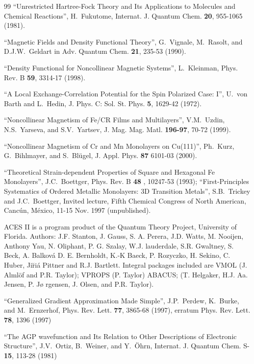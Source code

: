 \documentclass[nofootinbib,floatfix,aps,pra,preprint]{revtex4}
\begin{document}
\begin{thebibliography}{99}
 \textrm{{\small ``Unrestricted Hartree-Fock Theory and
Its Applications to Molecules and Chemical Reactions'', H.~Fukutome,
Internat. J. Quantum Chem. \textbf{20}, 955-1065 (1981). }}

 \textrm{{\small ``Magnetic Fields and Density
Functional Theory'', G.~Vignale, M.~Rasolt, and D.J.W.~Geldart in Adv.
Quantum Chem. \textbf{21}, 235-53 (1990). }}

 \textrm{{\small ``Density Functional for Noncollinear
Magnetic Systems'', L.~Kleinman, Phys. Rev. B \textbf{59}, 3314-17 (1998). }}

 \textrm{{\small ``A Local Exchange-Correlation Potential for
the Spin Polarized Case: I'', U.~von Barth and L.~Hedin, J. Phys. C: Sol.
St. Phys. \textbf{5}, 1629-42 (1972). }}

 \textrm{{\small ``Noncollinear Magnetism of Fe/CR Films
and Multilayers'', V.M.~Uzdin, N.S.~Yarseva, and S.V.~Yartsev, J. Mag. Mag.
Matl. \textbf{196-97}, 70-72 (1999). }}

 \textrm{{\small ``Noncollinear Magnetism of Cr and Mn
Monolayers on Cu(111)'', Ph.~Kurz, G.~Bihlmayer, and S.~Bl\"ugel, J. Appl.
Phys. \textbf{87} 6101-03 (2000). }}

 \textrm{{\small ``Theoretical Strain-dependent Properties of
Square and Hexagonal Fe Monolayers'', J.C.~Boettger, Phys. Rev. B \textbf{48}%
, 10247-53 (1993); ``First-Principles Systematics of Ordered Metallic
Monolayers: 3D Transition Metals'', S.B.~Trickey and J.C.~Boettger, Invited
lecture, Fifth Chemical Congress of North American, Canc\'un, M\'exico,
11-15 Nov. 1997 (unpublished). }}

 \textrm{{\small ACES II is a program product of the Quantum
Theory Project, University of Florida. Authors: J.F. Stanton, J. Gauss, S.
A. Perera, J.D. Watts, M. Nooijen, Anthony Yau, N. Oliphant, P. G. Szalay,
W.J. lauderdale, S.R. Gwaltney, S. Beck, A. Balkov{\'a} D. E. Bernholdt,
K.-K Baeck, P. Rozyczko, H. Sekino, C. Huber, Ji\u{r}i{\'a} Pittner and R.J.
Bartlett. Integral packages included are VMOL (J. Alml{\"o}f and P.R.
Taylor); VPROPS (P. Taylor) ABACUS; (T. Helgaker, H.J. Aa. Jensen, P. J{\o }%
rgensen, J. Olsen, and P.R. Taylor). }}

 \textrm{{\small ``Generalized Gradient Approximation Made
Simple'', J.P.~Perdew, K.~Burke, and M.~Ernzerhof, Phys. Rev. Lett. \textbf{%
77}, 3865-68 (1997), erratum Phys. Rev. Lett. \textbf{78}, 1396 (1997) }}

 \textrm{{\small ``The AGP wavefunction and Its Relation to
Other Descriptions of Electronic Structure'', J.V.~Ortiz, B.~Weiner, and
Y.~\"Ohrn, Internat. J. Quantum Chem. S-\textbf{15}, 113-28 (1981) }}
\end{thebibliography}
\end{document}
